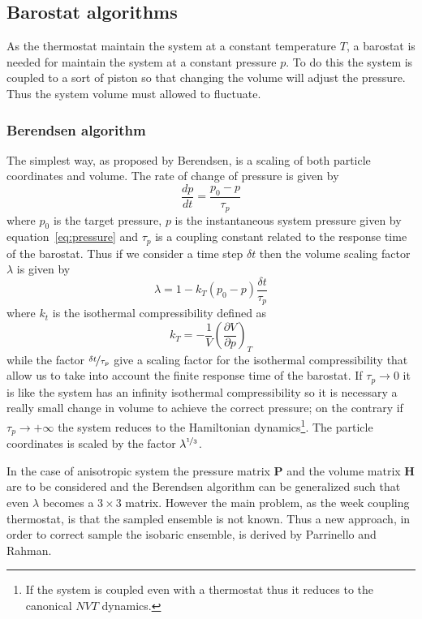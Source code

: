 \subsection{Barostat algorithms} %
As the thermostat maintain the system at a constant temperature $T$, a barostat is needed for maintain the system at a constant pressure $p$. To do this the system is coupled to a sort of piston so that changing the volume will adjust the pressure. Thus the system volume must allowed to fluctuate. 

\subsubsection{Berendsen algorithm}
The simplest way, as proposed by Berendsen, is a scaling of both particle coordinates and volume. The rate of change of pressure is given by
\begin{equation*}
	\frac{dp}{dt} = \frac{p_0 - p}{\tau_p}
\end{equation*}
where $p_0$ is the target pressure, $p$ is the instantaneous system pressure given by equation~\eqref{eq:pressure} and $\tau_p$ is a coupling constant related to the response time of the barostat. Thus if we consider a time step $\delta t$ then the volume scaling factor $\lambda$ is given by
\begin{equation*}
	\lambda = 1- k_T (p_0 - p) \frac{\delta t}{\tau_p}
\end{equation*}
where $k_t$ is the isothermal compressibility defined as
\begin{equation*}
	k_T = -\frac{1}{V}\left ( \frac{\partial V}{\partial p}\right )_{T}
\end{equation*}
while the factor $\nicefrac{\delta t}{\tau_p}$ give a scaling factor for the isothermal compressibility that allow us to take into account the finite response time of the barostat. If $\tau_p \rightarrow 0$ it is like the system has an infinity isothermal compressibility so it is necessary a really small change in volume to achieve the correct pressure; on the contrary if $\tau_p \rightarrow +\infty$ the system reduces to the Hamiltonian dynamics\footnote{If the system is coupled even with a thermostat thus it reduces to the canonical $NVT$ dynamics.}. The particle coordinates is scaled by the factor $\lambda^{\nicefrac{1}{3}}$.  

In the case of anisotropic system the pressure matrix $\mathbold{P}$ and the volume matrix $\mathbold{H}$ are to be considered and the Berendsen algorithm can be generalized such that even $\lambda$ becomes a $3\times 3$ matrix. However the main problem, as the week coupling thermostat, is that the sampled ensemble is not known. Thus a new approach, in order to correct sample the isobaric ensemble, is derived by Parrinello and Rahman.  

